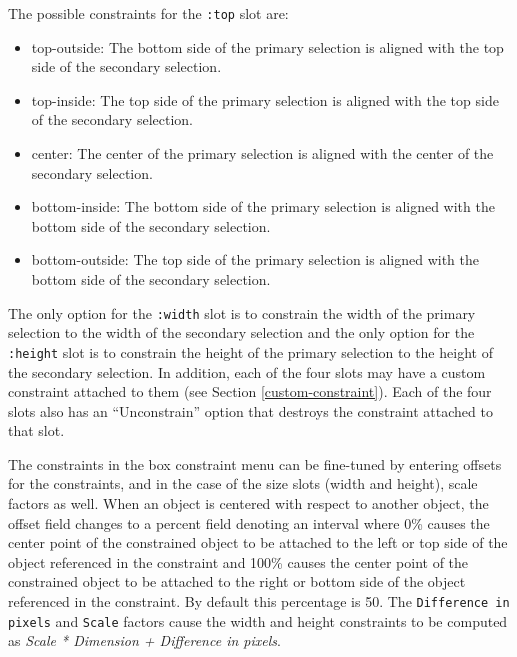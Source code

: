The possible constraints for the {\tt :top} slot are:

\begin{itemize}
\item top-outside: The bottom side of the primary selection is aligned with the
top side of the secondary selection.

\item top-inside: The top side of the primary selection is aligned with the
top side of the secondary selection.

\item center: The center of the primary selection is aligned with the center
of the secondary selection.

\item bottom-inside: The bottom side of the primary selection is aligned with the
bottom side of the secondary selection.

\item bottom-outside: The top side of the primary selection is aligned with the
bottom side of the secondary selection.

\end{itemize}

The only option for the {\tt :width} slot is to constrain
the width of the primary selection to the width of the secondary selection
and the only option for the {\tt :height} slot is to constrain the
height of the primary selection to the height of the secondary selection.
In addition, each of the four slots may have a custom constraint attached
to them (see Section \ref{custom-constraint}).
Each of the four slots also has an ``Unconstrain'' option that destroys the
constraint attached to that slot.

The constraints in the box constraint menu can be fine-tuned by entering
offsets for the constraints, and in the case of the size slots
(width and height), scale factors as well.
When an object is centered with respect to another object, the offset
field changes to a percent field denoting an interval where 0\% causes
the center point of the constrained object to be attached to the left or
top side of the object referenced in the constraint and 100\% causes the
center point of the constrained object to be attached to the right or
bottom side of the object referenced in the constraint.
By default this percentage is 50.
The {\tt Difference in pixels} and {\tt Scale} factors cause the width and
height constraints to be computed as {\it Scale * Dimension + Difference in pixels}.

